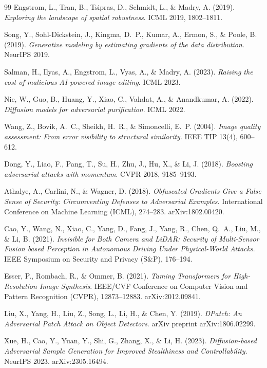 \documentclass[12pt,a4paper]{report}
\begin{document}
\begin{thebibliography}{99}
Engstrom, L., Tran, B., Tsipras, D., Schmidt, L., \& Madry, A. (2019).
\textit{Exploring the landscape of spatial robustness}.
ICML 2019, 1802--1811.

Song, Y., Sohl-Dickstein, J., Kingma, D.~P., Kumar, A., Ermon, S., \& Poole, B. (2019).
\textit{Generative modeling by estimating gradients of the data distribution}.
NeurIPS 2019.

Salman, H., Ilyas, A., Engstrom, L., Vyas, A., \& Madry, A. (2023).
\textit{Raising the cost of malicious AI-powered image editing}.
ICML 2023.

Nie, W., Guo, B., Huang, Y., Xiao, C., Vahdat, A., \& Anandkumar, A. (2022).
\textit{Diffusion models for adversarial purification}.
ICML 2022.

Wang, Z., Bovik, A.~C., Sheikh, H.~R., \& Simoncelli, E.~P. (2004).
\textit{Image quality assessment: From error visibility to structural similarity}.
IEEE TIP 13(4), 600--612.

Dong, Y., Liao, F., Pang, T., Su, H., Zhu, J., Hu, X., \& Li, J. (2018).
\textit{Boosting adversarial attacks with momentum}.
CVPR 2018, 9185--9193.

Athalye, A., Carlini, N., \& Wagner, D. (2018).
\textit{Obfuscated Gradients Give a False Sense of Security: Circumventing Defenses to Adversarial Examples}.
International Conference on Machine Learning (ICML), 274--283.
arXiv:1802.00420.

Cao, Y., Wang, N., Xiao, C., Yang, D., Fang, J., Yang, R., Chen, Q.~A., Liu, M., \& Li, B. (2021).
\textit{Invisible for Both Camera and LiDAR: Security of Multi-Sensor Fusion based Perception in Autonomous Driving Under Physical-World Attacks}.
IEEE Symposium on Security and Privacy (S\&P), 176--194.

Esser, P., Rombach, R., \& Ommer, B. (2021).
\textit{Taming Transformers for High-Resolution Image Synthesis}.
IEEE/CVF Conference on Computer Vision and Pattern Recognition (CVPR), 12873--12883.
arXiv:2012.09841.


Liu, X., Yang, H., Liu, Z., Song, L., Li, H., \& Chen, Y. (2019).
\textit{DPatch: An Adversarial Patch Attack on Object Detectors}.
arXiv preprint arXiv:1806.02299.

Xue, H., Cao, Y., Yuan, Y., Shi, G., Zhang, X., \& Li, H. (2023).
\textit{Diffusion-based Adversarial Sample Generation for Improved Stealthiness and Controllability}.
NeurIPS 2023. arXiv:2305.16494.


\end{thebibliography}
\end{document}
